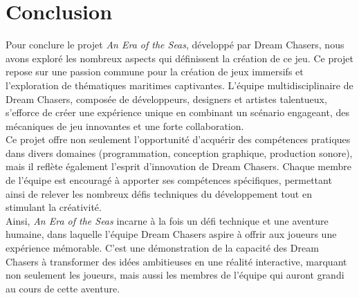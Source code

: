 \documentclass{article}
\begin{document}
\clearpage
\section{Conclusion}\hfill

Pour conclure le projet \textit{An Era of the Seas}, développé par Dream Chasers, nous avons exploré les nombreux aspects qui définissent la création de ce jeu. Ce projet repose sur une passion commune pour la création de jeux immersifs et l'exploration de thématiques maritimes captivantes. L'équipe multidisciplinaire de Dream Chasers, composée de développeurs, designers et artistes talentueux, s'efforce de créer une expérience unique en combinant un scénario engageant, des mécaniques de jeu innovantes et une forte collaboration.\\

Ce projet offre non seulement l'opportunité d'acquérir des compétences pratiques dans divers domaines (programmation, conception graphique, production sonore), mais il reflète également l'esprit d'innovation de Dream Chasers. Chaque membre de l'équipe est encouragé à apporter ses compétences spécifiques, permettant ainsi de relever les nombreux défis techniques du développement tout en stimulant la créativité.\\

Ainsi, \textit{An Era of the Seas} incarne à la fois un défi technique et une aventure humaine, dans laquelle l'équipe Dream Chasers aspire à offrir aux joueurs une expérience mémorable. C'est une démonstration de la capacité des Dream Chasers à transformer des idées ambitieuses en une réalité interactive, marquant non seulement les joueurs, mais aussi les membres de l'équipe qui auront grandi au cours de cette aventure.
\end{document}
